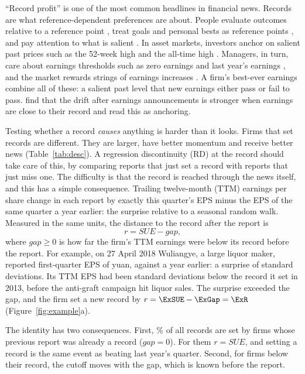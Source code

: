 \documentclass[11pt]{article}
\newcommand{\SUE}{\mathit{SUE}}
\newcommand{\gap}{\mathit{gap}}
\begin{document}
``Record profit'' is one of the most common headlines in financial news. Records are what reference-dependent
preferences are about. People evaluate outcomes relative to a reference point \citep{kahneman1979,koszegi2006}, treat
goals and personal bests as reference points \citep{heath1999,pope2011,allen2017}, and pay attention to what is
salient \citep{bordalo2012}. In asset markets, investors anchor on salient past prices such as the 52-week high and the
all-time high \citep{george2004,huddart2009,li2012,baker2012}. Managers, in turn, care about earnings thresholds such as
zero earnings and last year's earnings \citep{burgstahler1997,degeorge1999,graham2005}, and the market rewards strings
of earnings increases \citep{barth1999,myers2007}. A firm's best-ever earnings combine all of these: a salient past
level that new earnings either pass or fail to pass. \citet{jang2021} find that the drift after earnings
announcements is stronger when earnings are close to their record and read this as anchoring.

Testing whether a record \emph{causes} anything is harder than it looks. Firms that set records are different. They
are larger, have better momentum and receive better news (Table~\ref{tab:desc}). A regression discontinuity (RD) at
the record should take care of this, by comparing reports that just set a record with reports that just miss one. The
difficulty is that the record is reached through the news itself, and this has a simple consequence. Trailing
twelve-month (TTM) earnings per share change in each report by exactly this quarter's EPS minus the EPS of the same
quarter a year earlier: the surprise relative to a seasonal random walk. Measured in the same units, the distance to
the record after the report is
\begin{equation}
r = \SUE - \gap ,
\label{eq:identity}
\end{equation}
where $\gap\geq0$ is how far the firm's TTM earnings were below its record before the report. For example, on 27 April
2018 Wuliangye, a large liquor maker, reported first-quarter EPS of \ExEPS{} yuan, against \ExEPSlag{} a year earlier: a
surprise of \ExSUE{} standard deviations. Its TTM EPS had been \ExGap{} standard deviations below the record it set in
2013, before the anti-graft campaign hit liquor sales. The surprise exceeded the gap, and the firm set a new record by
$r=\ExSUE-\ExGap=\ExR$ (Figure~\ref{fig:example}a).

The identity has two consequences. First, \ShareRecAtRec\% of all records are set by firms whose previous report was
already a record ($\gap=0$). For them $r=\SUE$, and setting a record is the same event as beating last year's
quarter. Second, for firms below their record, the cutoff moves with the gap, which is known before the report.
\end{document}
